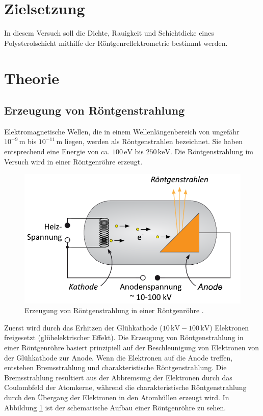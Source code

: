 \section{Zielsetzung}
In diesem Versuch soll die Dichte, Rauigkeit und Schichtdicke eines Polysterolschicht
mithilfe der Röntgenreflektrometrie bestimmt werden.

\section{Theorie}

\subsection{Erzeugung von Röntgenstrahlung}
Elektromagnetische Wellen, die in einem Wellenlängenbereich von ungefähr $10^{-9}\,\unit{\meter}$ bis $10^{-11}\,\unit{\meter}$
liegen, werden als Röntgenstrahlen bezeichnet. Sie haben entsprechend eine Energie von ca. $100\,\unit{\electronvolt}$ bis $250\,\unit{\kilo\electronvolt}$.
Die Röntgenstrahlung im Versuch wird in einer Röntgenröhre erzeugt.

\begin{figure}[H]
  \centering
  \includegraphics[scale=0.75]{röntgenröhre.pdf}
  \caption{Erzeugung von Röntgenstrahlung in einer Röntgenröhre \cite{uni_goettingen}.}
  \label{fig:roentgenroehre}
\end{figure}
\noindent
Zuerst wird durch das Erhitzen der Glühkathode ($10\,\unit{\kilo\volt}-100\,\unit{\kilo\volt}$) Elektronen freigesetzt (glühelektrischer Effekt).
Die Erzeugung von Röntgenstrahlung in einer Röntgenröhre basiert prinzipiell auf der Beschleunigung von Elektronen 
von der Glühkathode zur Anode. Wenn die Elektronen auf die Anode treffen, entstehen Bremsstrahlung 
und charakteristische Röntgenstrahlung. Die Bremsstrahlung resultiert aus der Abbremsung der Elektronen 
durch das Coulombfeld der Atomkerne, während die charakteristische Röntgenstrahlung durch den Übergang der Elektronen in den 
Atomhüllen erzeugt wird. In Abbildung \ref{fig:roentgenroehre} ist der schematische Aufbau einer 
Röntgenröhre zu sehen.




